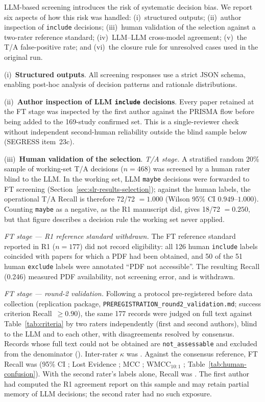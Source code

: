 LLM-based screening introduces the risk of systematic decision bias. We
report six aspects of how this risk was handled: (i)~structured outputs;
(ii)~author inspection of \texttt{include} decisions; (iii)~human
validation of the selection against a two-rater reference standard;
(iv)~LLM--LLM cross-model agreement; (v)~the T/A false-positive rate; and
(vi)~the closure rule for unresolved cases used in the original run.

(i)~\textbf{Structured outputs}. All screening responses use a strict JSON
schema, enabling post-hoc analysis of decision patterns and rationale
distributions.

(ii)~\textbf{Author inspection of LLM \texttt{include} decisions}.
Every paper retained at the FT stage was inspected by the first author against the
PRISMA flow before being added to the 169-study confirmed set. This is a
single-reviewer check without independent second-human reliability outside
the blind sample below (SEGRESS item~23c).

(iii)~\textbf{Human validation of the selection}.
\emph{T/A stage.} A stratified random 20\% sample of working-set T/A
decisions ($n=468$) was screened by a human rater blind to the LLM. In the
working set, LLM \texttt{maybe} decisions were forwarded to FT screening
(Section~\ref{sec:slr-results-selection}); against the human labels, the
operational T/A Recall is therefore 72/72 $=1.000$ (Wilson 95\% CI
$0.949$--$1.000$). Counting \texttt{maybe} as a negative, as the R1
manuscript did, gives 18/72 $=0.250$, but that figure describes a decision
rule the working set never applied.

\emph{FT stage --- R1 reference standard withdrawn.} The FT reference
standard reported in R1 ($n=177$) did not record eligibility: all 126 human
\texttt{include} labels coincided with papers for which a PDF had been
obtained, and 50 of the 51 human \texttt{exclude} labels were annotated
``PDF not accessible''. The resulting Recall (0.246) measured PDF
availability, not screening error, and is withdrawn.

\emph{FT stage --- round-2 validation.} Following a protocol pre-registered
before data collection (replication package,
\texttt{PREREGISTRATION\_round2\_validation.md}; success criterion
Recall~$\geq 0.90$), the same 177 records were judged on full text against
Table~\ref{tab:criteria} by two raters independently (first and second
authors), blind to the LLM and to each other, with disagreements resolved by
consensus. Records whose full text could not be obtained are
\texttt{not\_assessable} and excluded from the denominator ().
Inter-rater $\kappa$ was . Against the consensus reference,
FT Recall was  (95\% CI ; Lost Evidence ;
MCC ; WMCC$_{10:1}$ ; Table~\ref{tab:human-confusion}).
With the second rater's labels alone, Recall was . The first
author had computed the R1 agreement report on this sample and may retain
partial memory of LLM decisions; the second rater had no such exposure.

